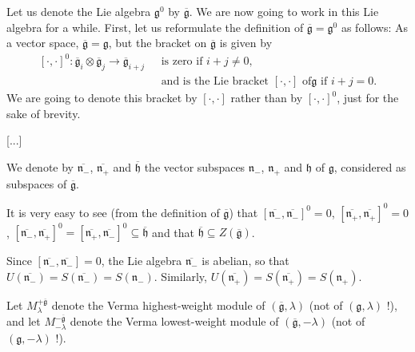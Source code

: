 \documentclass
[numbers=enddot,12pt,final,onecolumn,german,notitlepage]{scrartcl}%
\theoremstyle{definition}
\begin{document}
Let us denote the Lie algebra $\mathfrak{g}^{0}$ by $\overline{\mathfrak{g}}$.
We are now going to work in this Lie algebra for a while. First, let us
reformulate the definition of $\overline{\mathfrak{g}}=\mathfrak{g}^{0}$ as
follows: As a vector space, $\overline{\mathfrak{g}}=\mathfrak{g}$, but the
bracket on $\overline{\mathfrak{g}}$ is given by%
\begin{align*}
\left[  \cdot,\cdot\right]  ^{0}:\overline{\mathfrak{g}}_{i}\otimes
\overline{\mathfrak{g}}_{j}\rightarrow\overline{\mathfrak{g}}_{i+j}\text{ }
&  \text{is }\text{zero if }i+j\neq0\text{,}\\
&  \text{and is the Lie bracket }\left[  \cdot,\cdot\right]  \text{ of
}\mathfrak{g}\text{ if }i+j=0\text{.}%
\end{align*}
We are going to denote this bracket by $\left[  \cdot,\cdot\right]  $ rather
than by $\left[  \cdot,\cdot\right]  ^{0}$, just for the sake of brevity.

[...]

We denote by $\overline{\mathfrak{n}_{-}}$, $\overline{\mathfrak{n}_{+}}$ and
$\overline{\mathfrak{h}}$ the vector subspaces $\mathfrak{n}_{-}$,
$\mathfrak{n}_{+}$ and $\mathfrak{h}$ of $\mathfrak{g}$, considered as
subspaces of $\overline{\mathfrak{g}}$.

It is very easy to see (from the definition of $\overline{\mathfrak{g}}$) that
$\left[  \overline{\mathfrak{n}_{-}},\overline{\mathfrak{n}_{-}}\right]
^{0}=0$, $\left[  \overline{\mathfrak{n}_{+}},\overline{\mathfrak{n}_{+}%
}\right]  ^{0}=0$, $\left[  \overline{\mathfrak{n}_{-}},\overline
{\mathfrak{n}_{+}}\right]  ^{0}=\left[  \overline{\mathfrak{n}_{+}}%
,\overline{\mathfrak{n}_{-}}\right]  ^{0}\subseteq\overline{\mathfrak{h}}$ and
that $\overline{\mathfrak{h}}\subseteq Z\left(  \overline{\mathfrak{g}%
}\right)  $.

Since $\left[  \overline{\mathfrak{n}_{-}},\overline{\mathfrak{n}_{-}}\right]
=0$, the Lie algebra $\overline{\mathfrak{n}_{-}}$ is abelian, so that
$U\left(  \overline{\mathfrak{n}_{-}}\right)  =S\left(  \overline
{\mathfrak{n}_{-}}\right)  =S\left(  \mathfrak{n}_{-}\right)  $. Similarly,
$U\left(  \overline{\mathfrak{n}_{+}}\right)  =S\left(  \overline
{\mathfrak{n}_{+}}\right)  =S\left(  \mathfrak{n}_{+}\right)  $.

Let $M_{\lambda}^{+\overline{\mathfrak{g}}}$ denote the Verma highest-weight
module of $\left(  \overline{\mathfrak{g}},\lambda\right)  $ (not of $\left(
\mathfrak{g},\lambda\right)  $ !), and let $M_{-\lambda}^{-\overline
{\mathfrak{g}}}$ denote the Verma lowest-weight module of $\left(
\overline{\mathfrak{g}},-\lambda\right)  $ (not of $\left(  \mathfrak{g}%
,-\lambda\right)  $ !).
\end{document}
